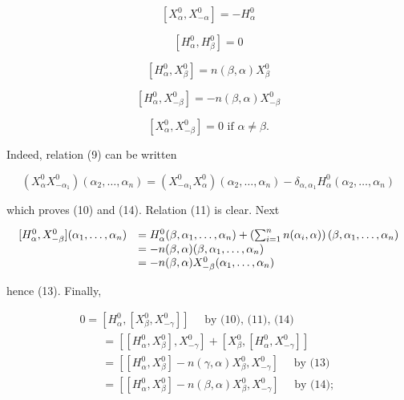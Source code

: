 \[
[ X _ {\alpha} ^ {0}, X _ {- \alpha} ^ {0} ] = - H _ {\alpha} ^ {0}\tag{10}
\]

\[
[ H _ {\alpha} ^ {0}, H _ {\beta} ^ {0} ] = 0\tag{11}
\]

\[
[ H _ {\alpha} ^ {0}, X _ {\beta} ^ {0} ] = n (\beta , \alpha) X _ {\beta} ^ {0}\tag{12}
\]

\[
[ H _ {\alpha} ^ {0}, X _ {- \beta} ^ {0} ] = - n (\beta , \alpha) X _ {- \beta} ^ {0}\tag{13}
\]

\[
[ X _ {\alpha} ^ {0}, X _ {- \beta} ^ {0} ] = 0 \text {   if   } \alpha \neq \beta .\tag{14}
\]

Indeed, relation (9) can be written

\[
(X _ {\alpha} ^ {0} X _ {- \alpha_ {1}} ^ {0}) (\alpha_ {2}, \ldots , \alpha_ {n}) = (X _ {- \alpha_ {1}} ^ {0} X _ {\alpha} ^ {0}) (\alpha_ {2}, \ldots , \alpha_ {n}) - \delta_ {\alpha , \alpha_ {1}} H _ {\alpha} ^ {0} (\alpha_ {2}, \ldots , \alpha_ {n})
\]

which proves (10) and (14). Relation (11) is clear. Next

\[
\begin{array}{r l} [ H _ {\alpha} ^ {0}, X _ {- \beta} ^ {0} ] (\alpha_ {1}, \ldots , \alpha_ {n}) & = H _ {\alpha} ^ {0} (\beta , \alpha_ {1}, \ldots , \alpha_ {n}) + \left(\sum_ {i = 1} ^ {n} n (\alpha_ {i}, \alpha)\right) (\beta , \alpha_ {1}, \ldots , \alpha_ {n}) \\ & = - n (\beta , \alpha) (\beta , \alpha_ {1}, \ldots , \alpha_ {n}) \\ & = - n (\beta , \alpha) X _ {- \beta} ^ {0} (\alpha_ {1}, \ldots , \alpha_ {n}) \end{array}
\]

hence (13). Finally,

\[
\begin{array}{l} 0 = [ H _ {\alpha} ^ {0}, [ X _ {\beta} ^ {0}, X _ {- \gamma} ^ {0} ] ] \quad \text { by (10), (11), (14)} \\ \qquad = [ [ H _ {\alpha} ^ {0}, X _ {\beta} ^ {0} ], X _ {- \gamma} ^ {0} ] + [ X _ {\beta} ^ {0}, [ H _ {\alpha} ^ {0}, X _ {- \gamma} ^ {0} ] ] \\ \qquad = [ [ H _ {\alpha} ^ {0}, X _ {\beta} ^ {0} ] - n (\gamma , \alpha) X _ {\beta} ^ {0}, X _ {- \gamma} ^ {0} ] \quad \text { by (13)} \\ \qquad = [ [ H _ {\alpha} ^ {0}, X _ {\beta} ^ {0} ] - n (\beta , \alpha) X _ {\beta} ^ {0}, X _ {- \gamma} ^ {0} ] \quad \text { by (14); } \end{array}\tag{15}
\]


